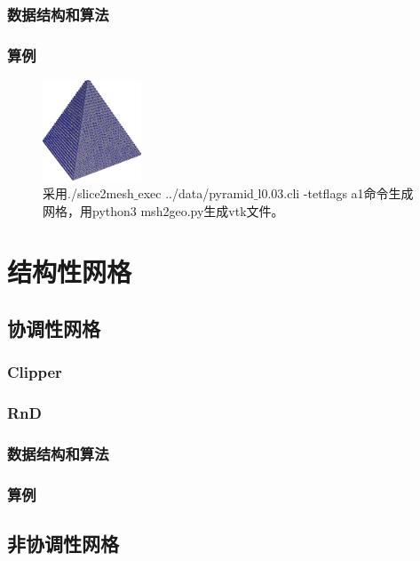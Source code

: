 \subsubsection{数据结构和算法}

\subsubsection{算例}

\begin{figure}[!htbp]
  \centering
  \includegraphics[height=3cm]{fig/1/20.png}
  \caption{采用./slice2mesh$\_$exec ../data/pyramid$\_$l0.03.cli -tetflags a1命令生成网格，用python3 msh2geo.py生成vtk文件。}
  \label{fig:1-7}
\end{figure}

\section{结构性网格}

\subsection{协调性网格}

\subsubsection{Clipper}

\subsubsection{RnD}

\subsubsection{数据结构和算法}

\subsubsection{算例}

\subsection{非协调性网格}


